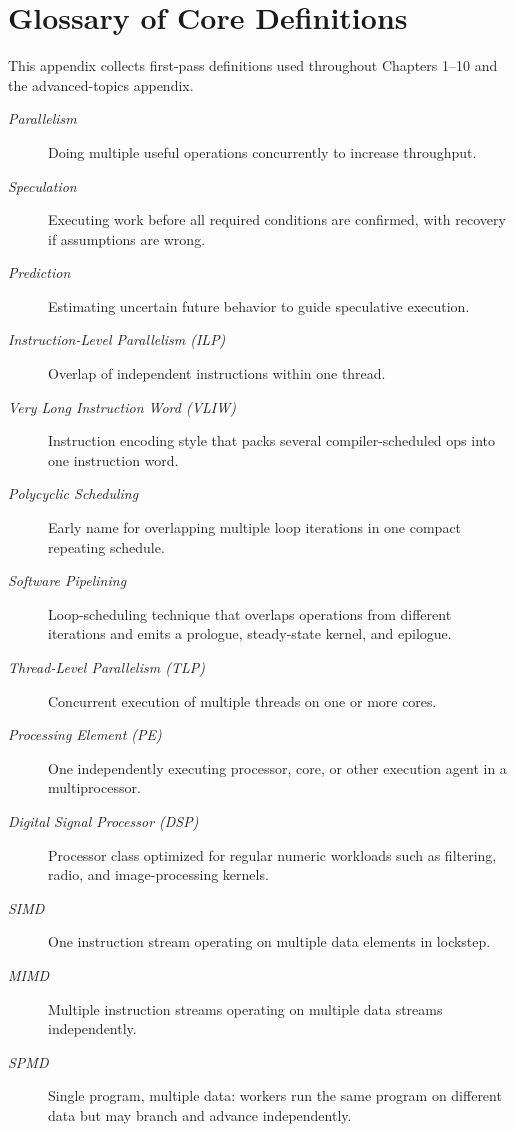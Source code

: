 \chapter{Glossary of Core Definitions}\label{ch:auto-007}
This appendix collects first-pass definitions used throughout Chapters 1--10 and the advanced-topics appendix.

\begin{description}
    \item[\textit{Parallelism}] Doing multiple useful operations concurrently to increase throughput.
    \item[\textit{Speculation}] Executing work before all required conditions are confirmed, with recovery if assumptions are wrong.
    \item[\textit{Prediction}] Estimating uncertain future behavior to guide speculative execution.
    \item[\textit{Instruction-Level Parallelism (ILP)}] Overlap of independent instructions within one thread.
    \item[\textit{Very Long Instruction Word (VLIW)}] Instruction encoding style that packs several compiler-scheduled ops into one instruction word.
    \item[\textit{Polycyclic Scheduling}] Early name for overlapping multiple loop iterations in one compact repeating schedule.
    \item[\textit{Software Pipelining}] Loop-scheduling technique that overlaps operations from different iterations and emits a prologue, steady-state kernel, and epilogue.
    \item[\textit{Thread-Level Parallelism (TLP)}] Concurrent execution of multiple threads on one or more cores.
    \item[\textit{Processing Element (PE)}] One independently executing processor, core, or other execution agent in a multiprocessor.
    \item[\textit{Digital Signal Processor (DSP)}] Processor class optimized for regular numeric workloads such as filtering, radio, and image-processing kernels.
    \item[\textit{SIMD}] One instruction stream operating on multiple data elements in lockstep.
    \item[\textit{MIMD}] Multiple instruction streams operating on multiple data streams independently.
    \item[\textit{SPMD}] Single program, multiple data: workers run the same program on different data but may branch and advance independently.

\end{description}
